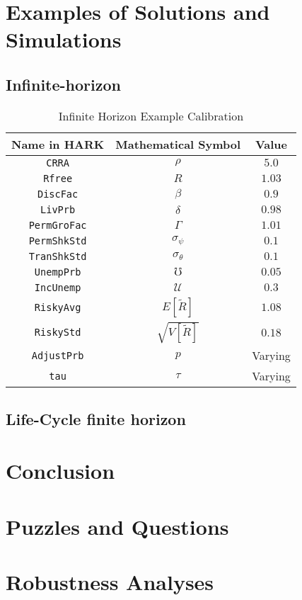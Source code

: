 \documentclass[./RiskyContrib.tex]{subfiles}
\begin{document}
\hypertarget{Examples}{}
\section{Examples of Solutions and Simulations}

\subsection{Infinite-horizon}

\begin{table}
\begin{center}
\caption{Infinite Horizon Example Calibration}\label{tab:inf_calibration}
\begin{tabular}{ccc}
\toprule
Name in HARK & Mathematical Symbol & Value \\
\midrule
\texttt{CRRA} & $\rho$ & $5.0$ \\
\texttt{Rfree} & $R$& $1.03$ \\
\texttt{DiscFac} & $\beta$ & $0.9$ \\
\texttt{LivPrb} & $\delta$ &  $0.98$ \\
\texttt{PermGroFac} & $\Gamma$ &  $1.01$ \\
\texttt{PermShkStd} & $\sigma_\psi$ &  $0.1$ \\
\texttt{TranShkStd} & $\sigma_\theta$ &  $0.1$ \\
\texttt{UnempPrb} & $\mho$ &  $0.05$ \\
\texttt{IncUnemp} & $\mathcal{U}$ &  $0.3$ \\
\texttt{RiskyAvg} & $E[\tilde{R}]$ &  $1.08$ \\
\texttt{RiskyStd} & $\sqrt{V[\tilde{R}]}$ &  $0.18$ \\
\texttt{AdjustPrb} & $p$ &  Varying \\
\texttt{tau} & $\tau$ & Varying \\
\bottomrule
\end{tabular}
\end{center}
\end{table}





\subsection{Life-Cycle finite horizon}



\hypertarget{Conclusion}{}
\section{Conclusion}

\hypertarget{Puzzles-and-Questions}{}
\section{Puzzles and Questions}\label{sec:Puzzles}

\hypertarget{Robustness Analyses}{}
\section{Robustness Analyses}

\clearpage\vfill\eject

\onlyinsubfile{}
\end{document}
